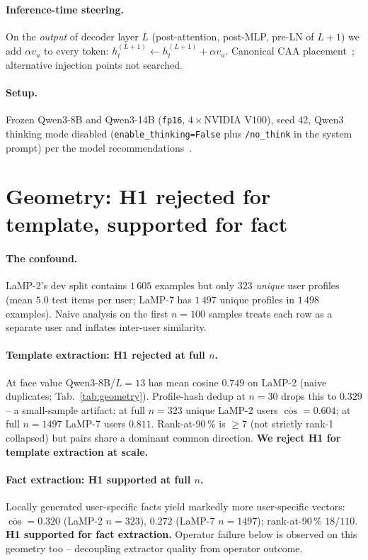 \documentclass{article}
\begin{document}
\paragraph{Inference-time steering.} On the \emph{output} of decoder
layer $L$ (post-attention, post-MLP, pre-LN of $L{+}1$) we add
$\alpha v_u$ to every token: $h^{(L+1)}_t \!\leftarrow\!
h^{(L+1)}_t \!+\! \alpha v_u$. Canonical CAA placement~\cite{rimsky2024caa,
turner2023actadd}; alternative injection points not searched.

\paragraph{Setup.} Frozen Qwen3-8B and Qwen3-14B
(\texttt{fp16}, $4\!\times$NVIDIA V100), seed 42, Qwen3 thinking mode
disabled (\texttt{enable\_thinking=False} plus \texttt{/no\_think} in
the system prompt) per the model
recommendations~\cite{qwen3technicalreport}.

\section{Geometry: H1 rejected for template, supported for fact}
\label{sec:geometry}

\paragraph{The confound.} LaMP-2's dev split contains $1\,605$
examples but only $323$ \emph{unique} user profiles (mean $5.0$ test
items per user; LaMP-7 has $1\,497$ unique profiles in $1\,498$
examples). Naive analysis on the first $n{=}100$ samples treats
each row as a separate user and inflates inter-user similarity.

\paragraph{Template extraction: H1 rejected at full $n$.}
At face value Qwen3-8B/$L{=}13$ has mean cosine $0.749$ on LaMP-2
(naive duplicates; Tab.~\ref{tab:geometry}). Profile-hash dedup at
$n{=}30$ drops this to $0.329$ -- a small-sample artifact: at full
$n{=}323$ unique LaMP-2 users $\overline{\cos}{=}0.604$; at full
$n{=}1497$ LaMP-7 users $0.811$. Rank-at-90\,\% is $\ge 7$ (not
strictly rank-1 collapsed) but pairs share a dominant common
direction.  \textbf{We reject H1 for template extraction at scale.}

\paragraph{Fact extraction: H1 supported at full $n$.}
Locally generated user-specific facts yield markedly more
user-specific vectors: $\overline{\cos}{=}0.320$ (LaMP-2 $n{=}323$),
$0.272$ (LaMP-7 $n{=}1497$); rank-at-90\,\% $18$/$110$.
\textbf{H1 supported for fact extraction.}  Operator failure below
is observed on this geometry too -- decoupling extractor quality
from operator outcome.
\end{document}
